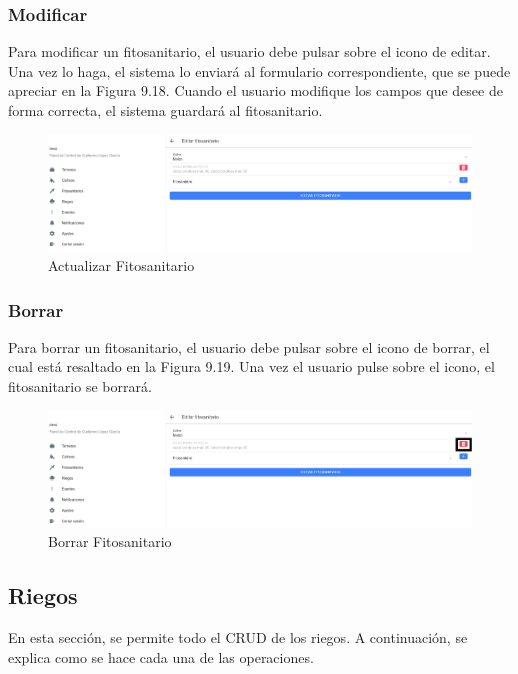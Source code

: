 \subsubsection{Modificar}
Para modificar un fitosanitario, el usuario debe pulsar sobre el icono de editar. Una vez lo haga, el sistema lo enviará al formulario correspondiente, que se puede apreciar en la Figura 9.18. Cuando el usuario modifique los campos que desee de forma correcta, el sistema guardará al fitosanitario.
\begin{figure}[H]
    \centering
    \includegraphics[width=0.7\linewidth]{images/user-manual/phytosanitary/update.png}
    \caption{Actualizar Fitosanitario}
\end{figure}

\subsubsection{Borrar}
Para borrar un fitosanitario, el usuario debe pulsar sobre el icono de borrar, el cual está resaltado en la Figura 9.19. Una vez el usuario pulse sobre el icono, el fitosanitario se borrará.
\begin{figure}[H]
    \centering
    \includegraphics[width=0.7\linewidth]{images/user-manual/phytosanitary/delete.png}
    \caption{Borrar Fitosanitario}
\end{figure}

\subsection{Riegos}
En esta sección, se permite todo el CRUD de los riegos. A continuación, se explica como se hace cada una de las operaciones.

